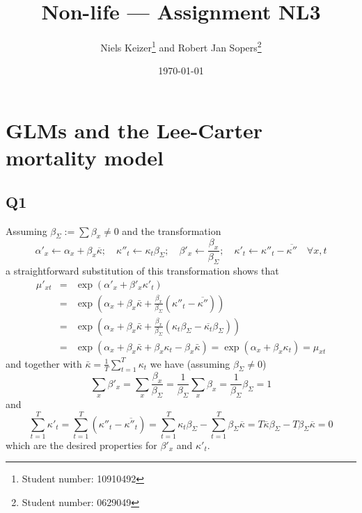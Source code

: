 \documentclass[11pt]{article}
\title{Non-life --- Assignment NL3}  %
\author{
  Niels Keizer\footnote{Student number: 10910492}
  \quad and \quad
  Robert Jan Sopers\footnote{Student number: 0629049}
}
\date{\today}
\begin{document}
\maketitle

\section{GLMs and the Lee-Carter mortality model}

\subsection*{Q1}

Assuming $\beta_\Sigma := \sum \beta_x \not = 0$ and the transformation
\begin{equation}
\alpha'_x  \leftarrow \alpha_x  + \beta_x \overline{\kappa}; \quad \kappa''_t \leftarrow \kappa_t \beta_\Sigma; \quad \beta'_x \leftarrow \frac{\beta_x}{\beta_\Sigma}; \quad \kappa'_t \leftarrow \kappa''_t  - \overline{\kappa''} \quad \forall x,t
\end{equation}
a straightforward substitution of this transformation shows that 
\begin{eqnarray*}
\mu'_{xt} &=& \exp(\alpha'_x + \beta'_x \kappa'_t) \\
		  &=& \exp \left ( \alpha_x + \beta_x \bar{\kappa} + \frac{\beta_x}{\beta_\Sigma} ( \kappa''_t - \overline{\kappa''}) \right ) \\
		  &=& \exp \left (  \alpha_x + \beta_x \bar{\kappa} + \frac{\beta_x}{\beta_\Sigma} ( \kappa_t \beta_\Sigma - \overline{\kappa_t} \beta_\Sigma) \right ) \\
		  &=& \exp \left ( \alpha_x + \beta_x \bar{\kappa} + \beta_x \kappa_t - \beta_x  \bar{\kappa}\right ) = \exp(\alpha_x + \beta_x \kappa_t)  = \mu_{xt}
\end{eqnarray*}
and together with $\bar{\kappa} = \frac{1}{T} \sum_{t=1}^T \kappa_t$ we have (assuming $\beta_\Sigma \not = 0$)
\begin{equation}
\sum_x \beta'_x = \sum_x \frac{\beta_x}{\beta_\Sigma} = \frac{1}{\beta_\Sigma} \sum_x \beta_x = \frac{1}{\beta_\Sigma} \beta_\Sigma = 1
\end{equation}
and 
\begin{equation}
\sum_{t=1}^T \kappa'_t = \sum_{t=1}^T (\kappa''_t - \overline{\kappa''_t}) = \sum_{t=1}^T \kappa_t \beta_\Sigma - \sum_{t=1}^T \beta_\Sigma \overline{\kappa} = T \overline{\kappa} \beta_\Sigma - T \beta_\Sigma \overline{\kappa} =0 
\end{equation}
which are the desired properties for $\beta'_x$ and $\kappa'_t$.
\end{document}

